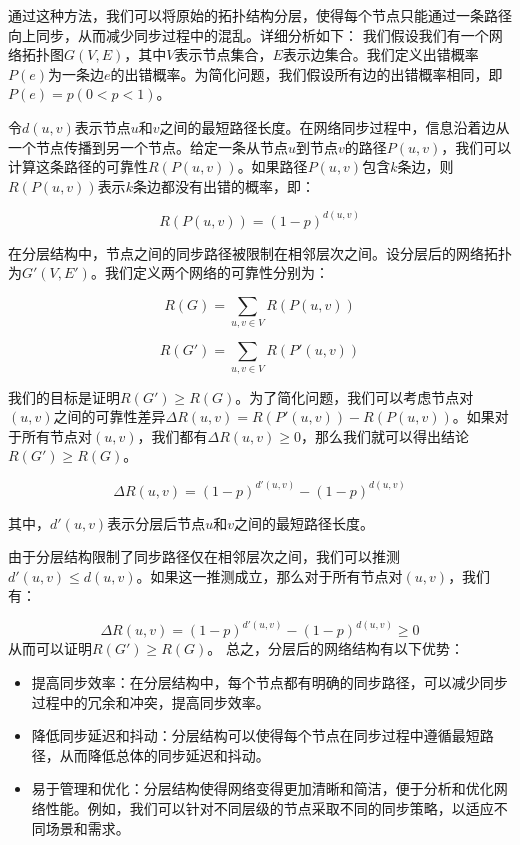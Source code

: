 \documentclass[UTF8,a4paper,12pt]{ctexart}
\numberwithin{equation}{section}
\begin{document}
通过这种方法，我们可以将原始的拓扑结构分层，使得每个节点只能通过一条路径向上同步，从而减少同步过程中的混乱。详细分析如下：
我们假设我们有一个网络拓扑图$G(V, E)$，其中$V$表示节点集合，$E$表示边集合。我们定义出错概率$P(e)$为一条边$e$的出错概率。为简化问题，我们假设所有边的出错概率相同，即$P(e) = p (0 < p < 1)$。

令$d(u, v)$表示节点$u$和$v$之间的最短路径长度。在网络同步过程中，信息沿着边从一个节点传播到另一个节点。给定一条从节点$u$到节点$v$的路径$P(u, v)$，我们可以计算这条路径的可靠性$R(P(u, v))$。如果路径$P(u, v)$包含$k$条边，则$R(P(u, v))$表示$k$条边都没有出错的概率，即：

\begin{equation}
	R(P(u, v)) = (1 - p)^{d(u,v)}
\end{equation}

在分层结构中，节点之间的同步路径被限制在相邻层次之间。设分层后的网络拓扑为$G'(V, E')$。我们定义两个网络的可靠性分别为：

\begin{equation}
	R(G) = \sum_{u, v \in V} R(P(u, v))
\end{equation}

\begin{equation}
	R(G') = \sum_{u, v \in V} R(P'(u, v))
\end{equation}

我们的目标是证明$R(G') \ge R(G)$。为了简化问题，我们可以考虑节点对$(u, v)$之间的可靠性差异$\Delta R(u, v) = R(P'(u, v)) - R(P(u, v))$。如果对于所有节点对$(u, v)$，我们都有$\Delta R(u, v) \ge 0$，那么我们就可以得出结论$R(G') \ge R(G)$。

\begin{equation}
	\Delta R(u, v) = (1 - p)^{d'(u,v)} - (1 - p)^{d(u,v)}
\end{equation}

其中，$d'(u,v)$表示分层后节点$u$和$v$之间的最短路径长度。

由于分层结构限制了同步路径仅在相邻层次之间，我们可以推测$d'(u,v) \le d(u,v)$。如果这一推测成立，那么对于所有节点对$(u, v)$，我们有：

\begin{equation}
	\Delta R(u, v) = (1 - p)^{d'(u,v)} - (1 - p)^{d(u,v)} \ge 0
\end{equation}
从而可以证明$R(G') \ge R(G)$。
总之，分层后的网络结构有以下优势：
\begin{itemize}
	\item 提高同步效率：在分层结构中，每个节点都有明确的同步路径，可以减少同步过程中的冗余和冲突，提高同步效率。
	\item 降低同步延迟和抖动：分层结构可以使得每个节点在同步过程中遵循最短路径，从而降低总体的同步延迟和抖动。
	\item 易于管理和优化：分层结构使得网络变得更加清晰和简洁，便于分析和优化网络性能。例如，我们可以针对不同层级的节点采取不同的同步策略，以适应不同场景和需求。
\end{itemize}
\end{document}
